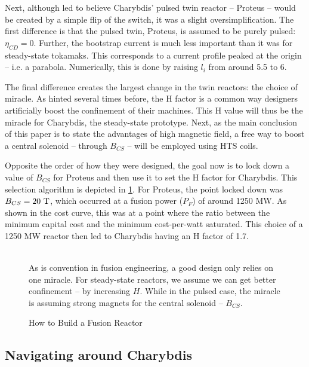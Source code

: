 Next, although led to believe Charybdis' pulsed twin reactor -- Proteus -- would be created by a simple flip of the switch, it was a slight oversimplification. The first difference is that the pulsed twin, Proteus, is assumed to be purely pulsed: $\eta_{CD} = 0$. Further, the bootstrap current is much less important than it was for steady-state tokamaks. This corresponds to a current profile peaked at the origin -- i.e. a parabola. Numerically, this is done by raising $l_i$ from around 5.5 to 6.

The final difference creates the largest change in the twin reactors: the choice of miracle. As hinted several times before, the H factor is a common way designers artificially boost the confinement of their machines. This H value will thus be the miracle for Charybdis, the steady-state prototype. Next, as the main conclusion of this paper is to state the advantages of high magnetic field, a free way to boost a central solenoid -- through $B_{CS}$ -- will be employed using HTS coils.

Opposite the order of how they were designed, the goal now is to lock down a value of $B_{CS}$ for Proteus and then use it to set the H factor for Charybdis. This selection algorithm is depicted in \cref{fig:selection}. For Proteus, the point locked down was $B_{CS} = 20 \ \textnormal{T}$, which occurred at a fusion power ($P_F$) of around 1250 MW. As shown in the cost curve, this was at a point where the ratio between the minimum capital cost and the minimum cost-per-watt saturated. This choice of a 1250 MW reactor then led to Charybdis having an H factor of 1.7.

\begin{figure}[h!]
\centering

\caption{How to Build a Fusion Reactor} ~ \\
\small As is convention in fusion engineering, a good design only relies on one miracle. For steady-state reactors, we assume we can get better confinement -- by increasing $H$. While in the pulsed case, the miracle is assuming strong magnets for the central solenoid -- $B_{CS}$.
\label{fig:selection}
\end{figure}

\clearpage

\newpage

\subsection{Navigating around Charybdis}

